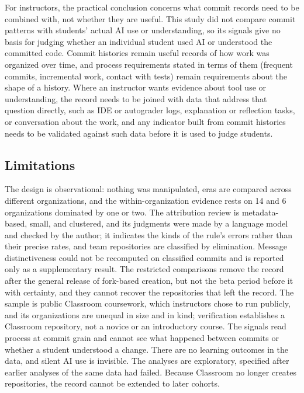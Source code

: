 \documentclass[acmsmall,screen,review,anonymous]{acmart}
\begin{document}
For instructors, the practical conclusion concerns what commit records need to be combined with, not whether they are useful. This study did not compare commit patterns with students' actual AI use or understanding, so its signals give no basis for judging whether an individual student used AI or understood the committed code. Commit histories remain useful records of how work was organized over time, and process requirements stated in terms of them (frequent commits, incremental work, contact with tests) remain requirements about the shape of a history. Where an instructor wants evidence about tool use or understanding, the record needs to be joined with data that address that question directly, such as IDE or autograder logs, explanation or reflection tasks, or conversation about the work, and any indicator built from commit histories needs to be validated against such data before it is used to judge students.

\subsection{Limitations}
\label{sec:limitations}

The design is observational: nothing was manipulated, eras are compared across different organizations, and the within-organization evidence rests on 14 and 6 organizations dominated by one or two. The attribution review is metadata-based, small, and clustered, and its judgments were made by a language model and checked by the author; it indicates the kinds of the rule's errors rather than their precise rates, and team repositories are classified by elimination. Message distinctiveness could not be recomputed on classified commits and is reported only as a supplementary result. The restricted comparisons remove the record after the general release of fork-based creation, but not the beta period before it with certainty, and they cannot recover the repositories that left the record. The sample is public Classroom coursework, which instructors chose to run publicly, and its organizations are unequal in size and in kind; verification establishes a Classroom repository, not a novice or an introductory course. The signals read process at commit grain and cannot see what happened between commits or whether a student understood a change. There are no learning outcomes in the data, and silent AI use is invisible. The analyses are exploratory, specified after earlier analyses of the same data had failed. Because Classroom no longer creates repositories, the record cannot be extended to later cohorts.
\end{document}

